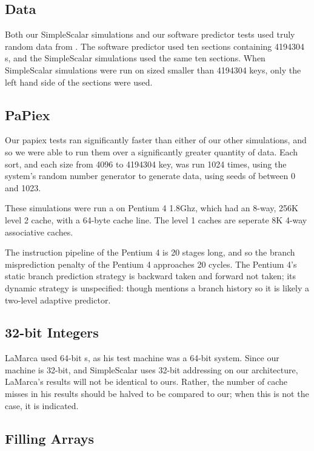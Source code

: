 \subsection{Data}

Both our SimpleScalar simulations and our software predictor tests used truly
random data from . The software predictor used ten
sections containing 4194304 s, and the SimpleScalar
simulations used the same ten sections. When SimpleScalar simulations were run
on sized smaller than 4194304 keys, only the left hand side of the sections were
used.

\subsection{PaPiex}

Our papiex tests ran significantly faster than either of our other simulations,
and so we were able to run them over a significantly greater quantity of data.
Each sort, and each size from 4096 to 4194304 key, was run 1024 times, using the
system's random number generator to generate data, using seeds of between 0 and
1023.

These simulations were run a on Pentium 4 1.8Ghz, which had an 8-way, 256K level
2 cache, with a 64-byte cache line. The level 1 caches are seperate 8K 4-way
associative caches.

The instruction pipeline of the Pentium 4 is 20 stages long, and so the branch
misprediction penalty of the Pentium 4 approaches 20 cycles. The Pentium 4's
static branch prediction strategy is backward taken and forward not taken; its
dynamic strategy is unspecified: though \cite{Intel248966-010} mentions a branch
history so it is likely a two-level adaptive predictor.

\subsection{32-bit Integers}
LaMarca used 64-bit s, as his test machine was a 64-bit system.
Since our machine is 32-bit, and SimpleScalar uses 32-bit addressing on our
architecture, LaMarca's results will not be identical to ours. Rather, the
number of cache misses in his results should be halved to be compared to our;
when this is not the case, it is indicated.


\subsection{Filling Arrays}


